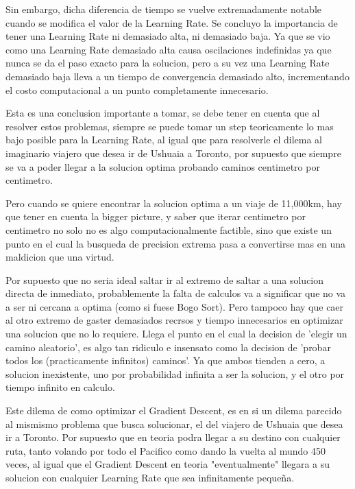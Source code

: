 \documentclass{article}
\begin{document}
\noindent Sin embargo, dicha diferencia de tiempo se vuelve extremadamente notable cuando se modifica el valor de la Learning Rate. Se concluyo la importancia de tener una Learning Rate ni demasiado alta, ni demasiado baja. Ya que se vio como una Learning Rate demasiado alta causa oscilaciones indefinidas ya que nunca se da el paso exacto para la solucion, pero a su vez una Learning Rate demasiado baja lleva a un tiempo de convergencia demasiado alto, incrementando el costo computacional a un punto completamente innecesario. \vspace{\baselineskip}

\noindent Esta es una conclusion importante a tomar, se debe tener en cuenta que al resolver estos problemas, siempre se puede tomar un step teoricamente lo mas bajo posible para la Learning Rate, al igual que para resolverle el dilema al imaginario viajero que desea ir de Ushuaia a Toronto, por supuesto que siempre se va a poder llegar a la solucion optima probando caminos centimetro por centimetro. 

\noindent Pero cuando se quiere encontrar la solucion optima a un viaje de 11,000km, hay que tener en cuenta la bigger picture, y saber que iterar centimetro por centimetro no solo no es algo computacionalmente factible, sino que existe un punto en el cual la busqueda de precision extrema pasa a convertirse mas en una maldicion que una virtud. 
\vspace{\baselineskip}

\noindent Por supuesto que no seria ideal saltar ir al extremo de saltar a una solucion directa de inmediato, probablemente la falta de calculos va a significar que no va a ser ni cercana a optima (como si fuese Bogo Sort). Pero tampoco hay que caer al otro extremo de gaster demasiados recrsos y tiempo innecesarios en optimizar una solucion que no lo requiere. Llega el punto en el cual la decision de 'elegir un camino aleatorio', es algo tan ridiculo e insensato como la decision de 'probar todos los (practicamente infinitos) caminos'. Ya que ambos tienden a cero, a solucion inexistente, uno por probabilidad infinita a ser la solucion, y el otro por tiempo infinito en calculo.
\vspace{\baselineskip}

\noindent Este dilema de como optimizar el Gradient Descent, es en si un dilema parecido al mismismo problema que busca solucionar, el del viajero de Ushuaia que desea ir a Toronto. Por supuesto que en teoria podra llegar a su destino con cualquier ruta, tanto volando por todo el Pacifico como dando la vuelta al mundo 450 veces, al igual que el Gradient Descent en teoria "eventualmente" llegara a su solucion con cualquier Learning Rate que sea infinitamente pequeña.  \vspace{\baselineskip}
\end{document}
